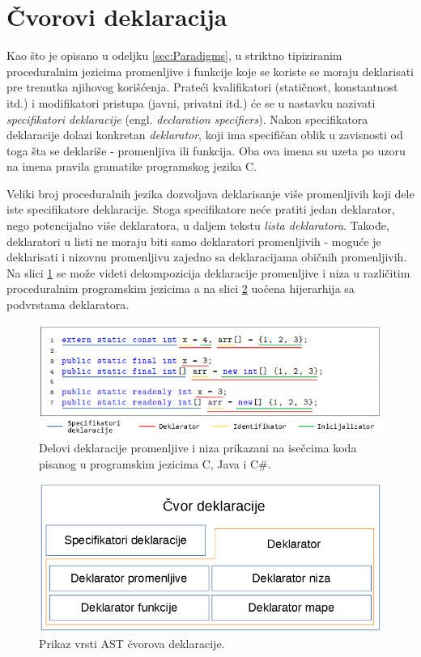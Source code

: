 \section{Čvorovi deklaracija}
\label{sec:MyASTDeclarationNodes}

Kao što je opisano u odeljku \ref{sec:Paradigms}, u striktno tipiziranim proceduralnim jezicima promenljive i funkcije koje se koriste se moraju deklarisati pre trenutka njihovog korišćenja. Prateći kvalifikatori (statičnost, konstantnost itd.) i modifikatori pristupa (javni, privatni itd.) će se u nastavku nazivati \emph{specifikatori deklaracije} (engl. \emph{declaration specifiers}). Nakon specifikatora deklaracije dolazi konkretan \emph{deklarator}, koji ima specifičan oblik u zavisnosti od toga šta se deklariše - promenljiva ili funkcija. Oba ova imena su uzeta po uzoru na imena pravila gramatike programskog jezika C. 

Veliki broj proceduralnih jezika dozvoljava deklarisanje više promenljivih koji dele iste specifikatore deklaracije. Stoga specifikatore neće pratiti jedan deklarator, nego potencijalno više deklaratora, u daljem tekstu \emph{lista deklaratora}. Takođe, deklaratori u listi ne moraju biti samo deklaratori promenljivih - moguće je deklarisati i nizovnu promenljivu zajedno sa deklaracijama običnih promenljivih. Na slici \ref{fig:DeclarationParts} se može videti dekompozicija deklaracije promenljive i niza u različitim proceduralnim programskim jezicima a na slici \ref{fig:DeclarationNodes} uočena hijerarhija sa podvrstama deklaratora.

\begin{figure}[h!]
    \centering
        \includegraphics[scale=0.9]{images/declaration_decomposition.png}
\caption{Delovi deklaracije promenljive i niza prikazani na isečcima koda pisanog u programskim jezicima C, Java i C\#.}
\label{fig:DeclarationParts}
\end{figure}

\begin{figure}[h!]
    \centering
        \includegraphics[scale=0.7]{images/declaration_nodes.png}
    \caption{Prikaz vrsti AST čvorova deklaracije.}
    \label{fig:DeclarationNodes}
\end{figure}


